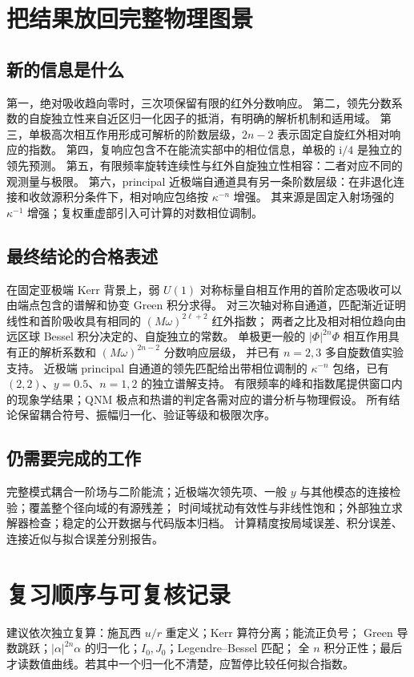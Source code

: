 \documentclass[UTF8,fontset=fandol,11pt,a4paper]{ctexart}
\newcommand{\ii}{\mathrm{i}}
\numberwithin{equation}{section}
\begin{document}
\section{把结果放回完整物理图景}
\subsection{新的信息是什么}
第一，绝对吸收趋向零时，三次项保留有限的红外分数响应。
第二，领先分数系数的自旋独立性来自近区归一化因子的抵消，有明确的解析机制和适用域。
第三，单极高次相互作用形成可解析的阶数层级，$2n-2$ 表示固定自旋红外相对响应的指数。
第四，复响应包含不在能流实部中的相位信息，单极的 $\ii/4$ 是独立的领先预测。
第五，有限频率旋转连续性与红外自旋独立性相容：二者对应不同的观测量与极限。
第六，principal 近极端自通道具有另一条阶数层级：在非退化连接和收敛源积分条件下，相对响应包络按 $\kappa^{-n}$ 增强。
其来源是固定入射场强的 $\kappa^{-1}$ 增强；复权重虚部引入可计算的对数相位调制。

\subsection{最终结论的合格表述}
在固定亚极端 Kerr 背景上，弱 $U(1)$ 对称标量自相互作用的首阶定态吸收可以由端点包含的谱解和协变 Green 积分求得。
对三次轴对称自通道，匹配渐近证明线性和首阶吸收具有相同的 $(M\omega)^{2\ell+2}$ 红外指数；
两者之比及相对相位趋向由远区球 Bessel 积分决定的、自旋独立的常数。
单极更一般的 $|\Phi|^{2n}\Phi$ 相互作用具有正的解析系数和 $(M\omega)^{2n-2}$ 分数响应层级，
并已有 $n=2,3$ 多自旋数值实验支持。
近极端 principal 自通道的领先匹配给出带相位调制的 $\kappa^{-n}$ 包络，已有 $(2,2)$、$y=0.5$、$n=1,2$ 的独立谱解支持。
有限频率的峰和指数尾提供窗口内的现象学结果；QNM 极点和热谱的判定各需对应的谱分析与物理假设。
所有结论保留耦合符号、振幅归一化、验证等级和极限次序。

\subsection{仍需要完成的工作}
完整模式耦合一阶场与二阶能流；近极端次领先项、一般 $y$ 与其他模态的连接检验；覆盖整个径向域的有源残差；
时间域扰动有效性与非线性饱和；外部独立求解器检查；稳定的公开数据与代码版本归档。
计算精度按局域误差、积分误差、连接近似与拟合误差分别报告。

\section{复习顺序与可复核记录}
建议依次独立复算：施瓦西 $u/r$ 重定义；Kerr 算符分离；能流正负号；
Green 导数跳跃；$|\alpha|^{2n}\alpha$ 的归一化；$I_0,J_0$；Legendre--Bessel 匹配；
全 $n$ 积分正性；最后才读数值曲线。若其中一个归一化不清楚，应暂停比较任何拟合指数。
\end{document}
